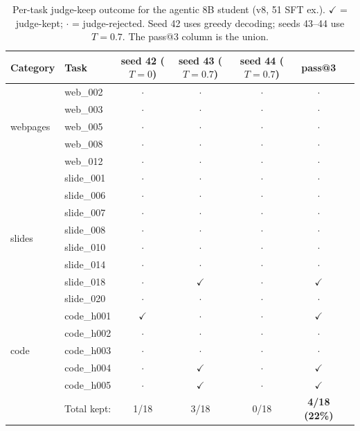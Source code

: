 \documentclass[11pt]{article}
\begin{document}
\begin{table}[ht]
\centering
\caption{Per-task judge-keep outcome for the agentic 8B student (v8, 51 SFT ex.). $\checkmark$ = judge-kept; $\cdot$ = judge-rejected. Seed 42 uses greedy decoding; seeds 43--44 use $T{=}0.7$. The pass@3 column is the union.}
\label{tab:per-task}
\small
\begin{tabular}{llccccc}
\toprule
Category & Task & seed 42 ($T{=}0$) & seed 43 ($T{=}0.7$) & seed 44 ($T{=}0.7$) & pass@3 \\
\midrule
\multirow{5}{*}{webpages} & web\_002 & $\cdot$ & $\cdot$ & $\cdot$ & $\cdot$ \\
& web\_003 & $\cdot$ & $\cdot$ & $\cdot$ & $\cdot$ \\
& web\_005 & $\cdot$ & $\cdot$ & $\cdot$ & $\cdot$ \\
& web\_008 & $\cdot$ & $\cdot$ & $\cdot$ & $\cdot$ \\
& web\_012 & $\cdot$ & $\cdot$ & $\cdot$ & $\cdot$ \\
\midrule
\multirow{8}{*}{slides} & slide\_001 & $\cdot$ & $\cdot$ & $\cdot$ & $\cdot$ \\
& slide\_006 & $\cdot$ & $\cdot$ & $\cdot$ & $\cdot$ \\
& slide\_007 & $\cdot$ & $\cdot$ & $\cdot$ & $\cdot$ \\
& slide\_008 & $\cdot$ & $\cdot$ & $\cdot$ & $\cdot$ \\
& slide\_010 & $\cdot$ & $\cdot$ & $\cdot$ & $\cdot$ \\
& slide\_014 & $\cdot$ & $\cdot$ & $\cdot$ & $\cdot$ \\
& slide\_018 & $\cdot$ & $\checkmark$ & $\cdot$ & $\checkmark$ \\
& slide\_020 & $\cdot$ & $\cdot$ & $\cdot$ & $\cdot$ \\
\midrule
\multirow{5}{*}{code} & code\_h001 & $\checkmark$ & $\cdot$ & $\cdot$ & $\checkmark$ \\
& code\_h002 & $\cdot$ & $\cdot$ & $\cdot$ & $\cdot$ \\
& code\_h003 & $\cdot$ & $\cdot$ & $\cdot$ & $\cdot$ \\
& code\_h004 & $\cdot$ & $\checkmark$ & $\cdot$ & $\checkmark$ \\
& code\_h005 & $\cdot$ & $\checkmark$ & $\cdot$ & $\checkmark$ \\
\midrule
\multicolumn{2}{r}{Total kept:} & 1/18 & 3/18 & 0/18 & \textbf{4/18 (22\%)} \\
\bottomrule
\end{tabular}
\end{table}
\end{document}
